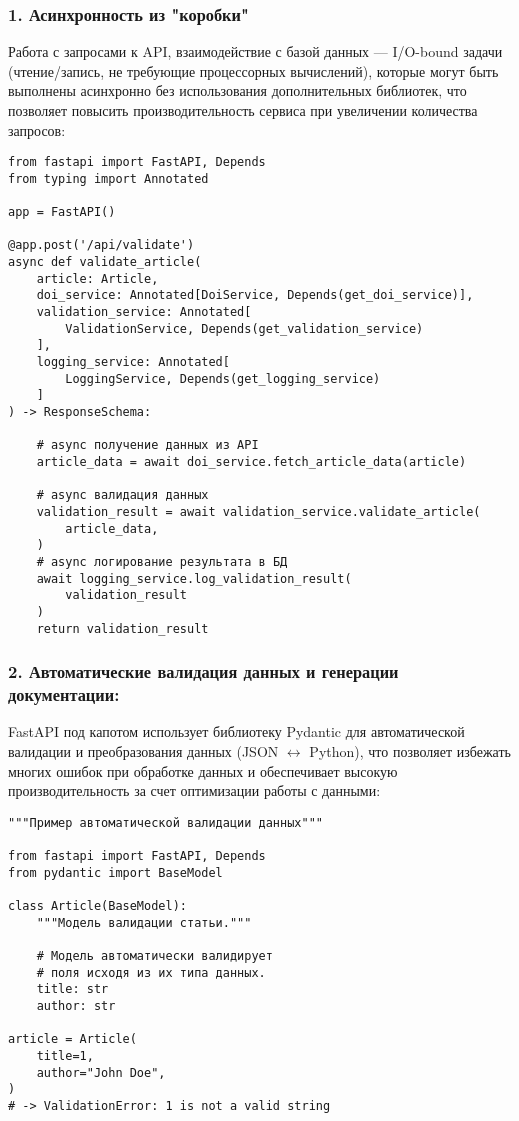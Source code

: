 \subsubsection*{1. Асинхронность из "коробки"}
Работа с запросами к API, взаимодействие с базой данных 
--- I/O-bound задачи (чтение/запись, не требующие процессорных вычислений), которые 
могут быть выполнены асинхронно без использования дополнительных библиотек, что позволяет 
повысить производительность сервиса при увеличении количества запросов:


\begin{verbatim}
from fastapi import FastAPI, Depends
from typing import Annotated

app = FastAPI()

@app.post('/api/validate')
async def validate_article(
    article: Article, 
    doi_service: Annotated[DoiService, Depends(get_doi_service)],
    validation_service: Annotated[
        ValidationService, Depends(get_validation_service)
    ],
    logging_service: Annotated[
        LoggingService, Depends(get_logging_service)
    ]
) -> ResponseSchema:

    # async получение данных из API
    article_data = await doi_service.fetch_article_data(article)

    # async валидация данных
    validation_result = await validation_service.validate_article(
        article_data,
    )
    # async логирование результата в БД
    await logging_service.log_validation_result(
        validation_result
    )
    return validation_result
\end{verbatim}

\subsubsection*{2. Автоматические валидация данных и генерации документации:}
FastAPI под капотом использует библиотеку Pydantic для автоматической валидации 
и преобразования данных (JSON $\leftrightarrow$ Python), что позволяет избежать многих ошибок
при обработке данных и обеспечивает высокую производительность за счет оптимизации 
работы с данными:

\begin{verbatim}
"""Пример автоматической валидации данных"""

from fastapi import FastAPI, Depends
from pydantic import BaseModel

class Article(BaseModel):
	"""Модель валидации статьи."""

    # Модель автоматически валидирует
    # поля исходя из их типа данных.
    title: str
    author: str

article = Article(
    title=1,
    author="John Doe",
)
# -> ValidationError: 1 is not a valid string
\end{verbatim}

